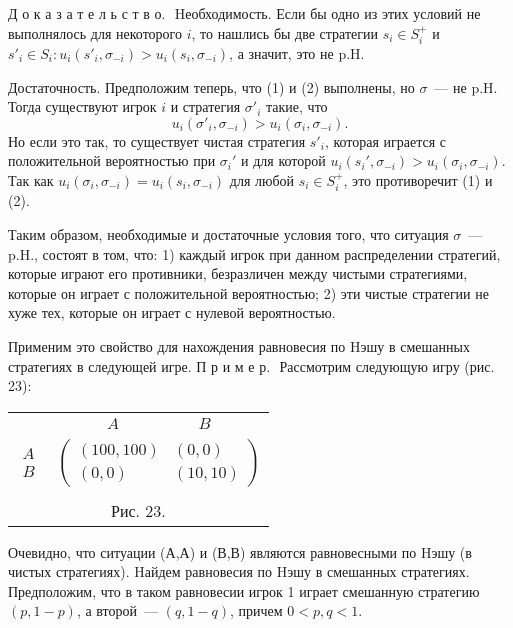 {Д о к а з а т е л ь с т в о.\,\, Hеобходимость. Если бы одно из этих
условий не выполнялось для некоторого $i$, то нашлись бы две
стратегии $s_i\in S^+_i$ и $s'_i\in S_i:u_i(s'_i,\sigma_{-i})>
u_i(s_i, \sigma_{- i})$, а значит, это не p.H.

Достаточность. Предположим теперь, что (1) и (2) выполнены, но
$\sigma$~--- не  p.H. Тогда существуют игрок $i$ и стратегия
$\sigma'_i$ такие, что
$$
u_i(\sigma'_i,\sigma_{-i})>u_i(\sigma_i,\sigma_{-i}).
$$
Но если это так, то существует чистая стратегия $s'_i$, которая
играется с положительной вероятностью при $\sigma_i'$ и для которой
$u_i(s_i',\sigma_{-i})> u_i(\sigma_i,\sigma_{-i})$. Так как
$u_i(\sigma_i,\sigma_{-i})=u_i(s_i, \sigma_{-i})$ для любой $s_i\in
S^+_i$, это противоречит (1) и (2).

Таким  образом, необходимые и  достаточные условия того, что
ситуация $\sigma$~--- p.H., состоят в том, что: 1) каждый игрок при
данном распределении стратегий, которые играют его противники,
безразличен между чистыми стратегиями, которые он играет с
положительной вероятностью; 2) эти чистые стратегии  не хуже тех,
которые он играет с нулевой вероятностью.

Применим это свойство для нахождения равновесия по Hэшу в смешанных
стратегиях в следующей игре.
\smallskip
\clearpage П р и м е р.\,\, Рассмотрим следующую игру (рис.\,23):

\begin{center}
\begin{tabular}{cc}
&$\begin{array}{cc} A\qquad&\qquad\, B\end{array}$\\
$\begin{array}{c} A\\ B\end{array}$& $\left(\begin{array}{cc}
(100,100)& (0,0)\\
(0,0)&(10,10)\end{array}\right)$\\
\multicolumn{2}{c}{}\\
\multicolumn{2}{c}{Рис. 23.}\\
\end{tabular}
\end{center}

Очевидно, что ситуации (А,А) и (В,В) являются равновесными по Hэшу
(в чистых стратегиях). Hайдем равновесия по Hэшу в смешанных
стратегиях. Предположим, что в таком равновесии игрок 1 играет
смешанную стратегию $(p,1-p)$, а второй~--- $(q,1-q)$, причем
$0<p,q<1$.

}
